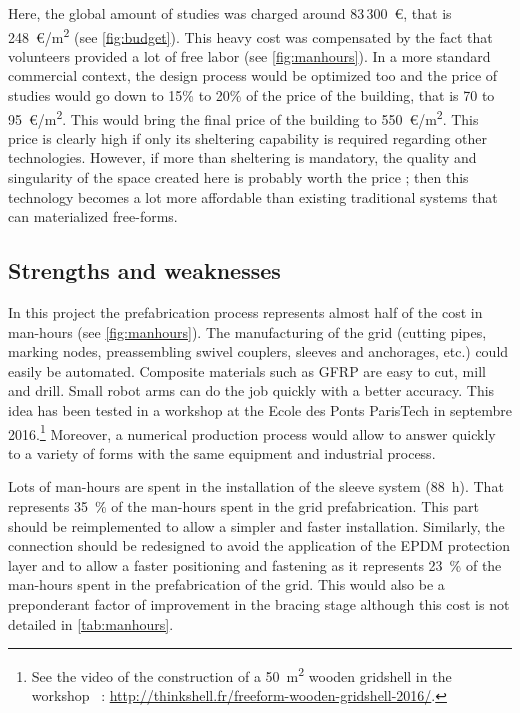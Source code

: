 Here, the global amount of studies was charged around 83\,300~€, that is 248~€/m\textsuperscript{2} (see \cref{fig:budget}). This heavy cost was compensated by the fact that volunteers provided a lot of free labor (see \cref{fig:manhours}). In a more standard commercial context, the design process would be optimized too and the price of studies would go down to 15\% to 20\% of the price of the building, that is 70 to 95~€/m\textsuperscript{2}. This would bring the final price of the building to 550~€/m\textsuperscript{2}. This price is clearly high if only its sheltering capability is required regarding other technologies. However, if more than sheltering is mandatory, the quality and singularity of the space created here is probably worth the price ; then this technology becomes a lot more affordable than existing traditional systems that can materialized free-forms.

\subsection{Strengths and weaknesses}
In this project the prefabrication process represents almost half of the cost in man-hours (see \cref{fig:manhours}). The manufacturing of the grid (cutting pipes, marking nodes, preassembling swivel couplers, sleeves and anchorages, etc.) could easily be automated. Composite materials such as GFRP are easy to cut, mill and drill. Small robot arms can do the job quickly with a better accuracy. This idea has been tested in a workshop at the Ecole des Ponts ParisTech in septembre 2016.\footnote{See the video of the construction of a 50~m\textsuperscript{2} wooden gridshell in the workshop ~: \url{http://thinkshell.fr/freeform-wooden-gridshell-2016/}.} Moreover, a numerical production process would allow to answer quickly to a variety of forms with the same equipment and industrial process.

Lots of man-hours are spent in the installation of the sleeve system (88~h). That represents 35~\% of the man-hours spent in the grid prefabrication. This part should be reimplemented to allow a simpler and faster installation. Similarly, the connection should be redesigned to avoid the application of the EPDM protection layer and to allow a faster positioning and fastening as it represents 23~\% of the man-hours spent in the prefabrication of the grid. This would also be a preponderant factor of improvement in the bracing stage although this cost is not detailed in \cref{tab:manhours}.

